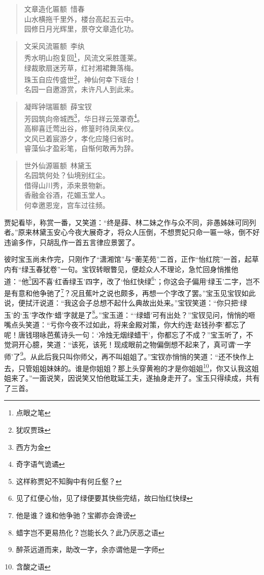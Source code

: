 \documentclass[12pt,oneside]{book}
\newenvironment{shici}{%
\begin{verse}%
\centering\large\hspace{12pt}}%
{\end{verse}}
\begin{document}
\begin{shici}
文章造化匾额~惜春\\
山水横拖千里外，楼台高起五云中。\\
园修日月光辉里，景夺文章造化功。
\end{shici}

\begin{shici}
文采风流匾额~李纨\\
秀水明山抱复回\footnote{点眼之笔}，风流文采胜蓬莱。\\
绿裁歌扇迷芳草，红衬湘裙舞落梅。\\
珠玉自应传盛世\footnote{犹叹贾珠}，神仙何幸下瑶台！\\
名园一自邀游赏，未许凡人到此来。
\end{shici}

\begin{shici}
凝晖钟瑞匾额~薛宝钗\\
芳园筑向帝城西\footnote{西方为金}，华日祥云笼罩奇\footnote{奇字语气诡谲}。\\
高柳喜迁莺出谷，修篁时待凤来仪。\\
文风已着宸游夕，孝化应隆归省时。\\
睿藻仙才盈彩笔，自惭何敢再为辞。
\end{shici}

\begin{shici}
世外仙源匾额~林黛玉\\
名园筑何处？仙境别红尘。\\
借得山川秀，添来景物新。\\
香融金谷酒，花媚玉堂人。\\
何幸邀恩宠，宫车过往频。
\end{shici}


贾妃看毕，称赏一番，又笑道：“终是薛、林二妹之作与众不同，非愚姊妹可同列者。”原来林黛玉安心今夜大展奇才，将众人压倒，不想贾妃只命一匾一咏，倒不好违谕多作，只胡乱作一首五言律应景罢了。

彼时宝玉尚未作完，只刚作了“潇湘馆”与“蘅芜苑”二首，正作“怡红院”一首，起草内有“绿玉春犹卷”一句。宝钗转眼瞥见，便趁众人不理论，急忙回身悄推他道：“他\footnote{这样称贾妃不知胸中有何丘壑？}因不喜‘红香绿玉’四字，改了‘怡红快绿\footnote{见了红便心怡，见了绿便要其快些完结，故曰怡红快绿}’；你这会子偏用‘绿玉’二字，岂不是有意和他争驰了\footnote{他是谁？谁和他争驰？宝卿亦会谗谤}？况且蕉叶之说也颇多，再想一个字改了罢。”宝玉见宝钗如此说，便拭汗说道：“我这会子总想不起什么典故出处来。”宝钗笑道：“你只把‘绿玉’的‘玉’字改作‘蜡’字就是了\footnote{蜡字岂不更易热化？岂能长久？此乃厌恶之语}。”宝玉道：“‘绿蜡’可有出处？”宝钗见问，悄悄的咂嘴点头笑道：“亏你今夜不过如此，将来金殿对策，你大约连‘赵钱孙李’都忘了呢！唐钱珝咏芭蕉诗头一句：‘冷烛无烟绿蜡干’，你都忘了不成？”宝玉听了，不觉洞开心臆，笑道：“该死，该死！现成眼前之物偏倒想不起来了，真可谓‘一字师’了\footnote{醉茶远道而来，助改一字，余亦谓他是一字师}。从此后我只叫你师父，再不叫姐姐了。”宝钗亦悄悄的笑道：“还不快作上去，只管姐姐妹妹的。谁是你姐姐？那上头穿黄袍的才是你姐姐\footnote{含酸之语}，你又认我这姐姐来了。”一面说笑，因说笑又怕他耽延工夫，遂抽身走开了。宝玉只得续成，共有了三首。
\end{document}
